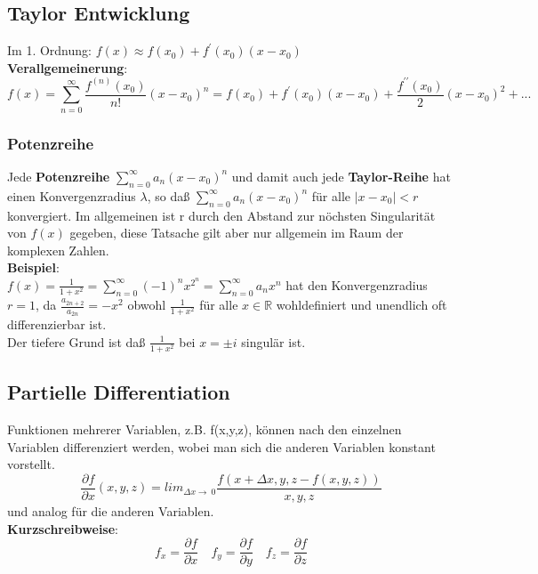 \documentclass[11pt]{article}
\newcommand{\R}{\mathbb{R}}
\begin{document}
\subsection{Taylor Entwicklung}
	Im 1. Ordnung: $f(x) \approx f(x_0) + f^\prime(x_0)(x-x_0)$\\
\textbf{Verallgemeinerung}:\
	\[ f(x)= \sum_{n=0}^{\infty}\frac{f^(n) (x_0)}{n!} (x-x_0)^n = f(x_0) + f^\prime (x_0) (x - x_0) + \frac{f^{\prime\prime}(x_0)}{2} (x-x_0)^2 + ... \]
	\subsubsection{Potenzreihe}
	Jede \textbf{Potenzreihe} 
	$\sum_{n=0}^{\infty}a_n(x-x_0)^n$ und damit auch jede \textbf{Taylor-Reihe} hat einen Konvergenzradius $\lambda$, so daß $\sum_{n=0}^{\infty}a_n(x-x_0)^n$ für alle $|x-x_0| < r$ konvergiert. Im allgemeinen ist r durch den Abstand zur nöchsten Singularität von $f(x)$ gegeben, diese Tatsache gilt aber nur allgemein im Raum der komplexen Zahlen.\\
	\textbf{Beispiel}:\\ 
	$f(x) = \frac{1}{1 + x^2} = \sum_{n=0}^{\infty} (-1)^n x^{2^n} = \sum_{n=0}^{\infty} a_nx^n $ hat den Konvergenzradius $r = 1$, da $\frac{a_{2n+2}}{a_{2n}} = -x^2$ obwohl $\frac{1}{1+x^2}$ für alle $x \in \R$ wohldefiniert und unendlich oft differenzierbar ist. \\
	Der tiefere Grund ist daß $ \frac{1 }{1 + x^2} $ bei $x = \pm i$ singulär ist. 
	\subsection{Partielle Differentiation}
		Funktionen mehrerer Variablen, z.B. f(x,y,z), können nach den einzelnen Variablen differenziert werden, wobei man sich die anderen Variablen konstant vorstellt.\\
		\[ \frac{\partial f}{\partial x}(x,y,z) =  lim_{\Delta x \to\ 0} \frac{f(x+\Delta x,y,z - f(x,y,z))}{x,y,z} \]
		und analog für die anderen Variablen.\\ \textbf{Kurzschreibweise}:\\
		\[ f_x = \frac{\partial f}{\partial x} \quad f_y = \frac{\partial f}{\partial y} \quad f_z = \frac{\partial f}{\partial z} \] \\
\end{document}
